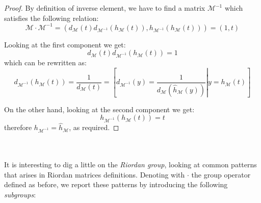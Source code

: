 \begin{proof}
    By definition of inverse element, 
    we have to find a matrix $\mathcal{M}^{-1}$ which satisfies the following relation:
    \begin{displaymath}
        \mathcal{M}\cdot\mathcal{M}^{-1}
            =\left(d_{\mathcal{M}}(t)d_{\mathcal{M}^{-1}}(h_{\mathcal{M}}(t)),
                    h_{\mathcal{M}^{-1}}(h_{\mathcal{M}}(t))\right)
            =\left(1,t\right)
    \end{displaymath}

    Looking at the first component we get:
    \begin{displaymath}
        d_{\mathcal{M}}(t)d_{\mathcal{M}^{-1}}(h_{\mathcal{M}}(t))=1    
    \end{displaymath}
    which can be rewritten as:
    \begin{displaymath}
        d_{\mathcal{M}^{-1}}(h_{\mathcal{M}}(t))=\frac{1}{d_{\mathcal{M}}(t)}    
            = \left.\left[
                d_{\mathcal{M}^{-1}}(y)=\frac{1}{d_{\mathcal{M}}(\hat{h}_{\mathcal{M}}(y))}
                    \right|y=h_{\mathcal{M}}(t)
                \right]
    \end{displaymath}

    On the other hand, looking at the second component we get:
    \begin{displaymath}
        h_{\mathcal{M}^{-1}}(h_{\mathcal{M}}(t))=t
    \end{displaymath}
    therefore $h_{\mathcal{M}^{-1}}=\hat{h}_{\mathcal{M}}$, as required.
\end{proof}
\quad
\\\\
It 
is interesting to dig a little on the \emph{Riordan group}, looking at
common patterns that arises in Riordan matrices definitions. Denoting with
$\cdot$ the group operator defined as before, we report
these patterns by introducing the following \emph{subgroups}:
